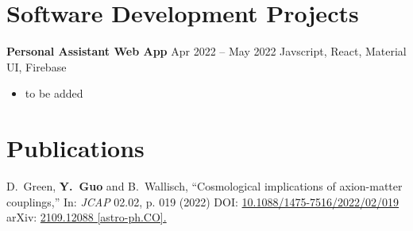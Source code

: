 \documentclass[letterpaper,12pt]{article}
\newenvironment{zitemize}{
\begin{itemize} \vspace{-.9em}\itemsep 0pt \parskip 0pt}
{\end{itemize}\vspace{-.5em}}
\begin{document}
\section{Software Development Projects}

\textbf{Personal Assistant Web App} \hfill Apr 2022 -- May 2022
Javscript, React, Material UI, Firebase
\begin{zitemize}
\item to be added
\end{zitemize}



\section{Publications}

D.~Green, \textbf{Y.~Guo} and B.~Wallisch,
``Cosmological implications of axion-matter couplings,''
In: \textit{JCAP} 02.02, p. 019 (2022)
DOI: \href{https://iopscience.iop.org/article/10.1088/1475-7516/2022/02/019}{10.1088/1475-7516/2022/02/019}
arXiv: \href{https://arxiv.org/abs/2109.12088?context=hep-ph}{2109.12088 [astro-ph.CO].}
\end{document}
